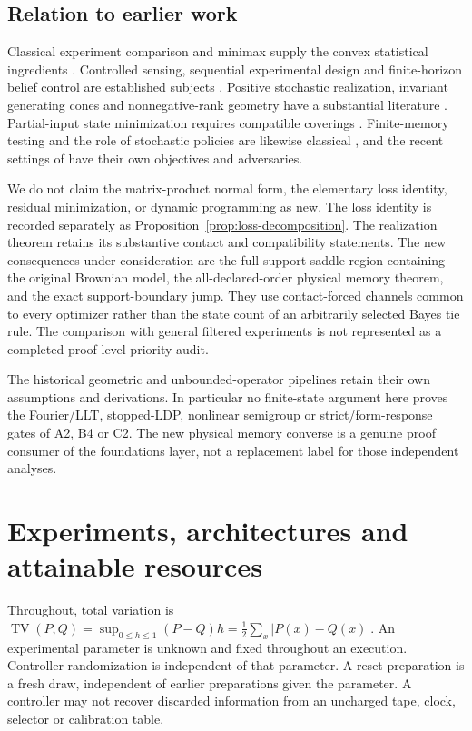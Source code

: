 \documentclass[11pt]{amsart}
\theoremstyle{definition}\newtheorem{definition}[theorem]{Definition}
\theoremstyle{remark}\newtheorem{remark}[theorem]{Remark}
\newcommand{\TV}{\operatorname{TV}}
\newcommand{\1}{\mathbf 1}
\begin{document}
\subsection{Relation to earlier work}
Classical experiment comparison and minimax supply the convex
statistical ingredients \cite{Blackwell,Sion}. Controlled sensing,
sequential experimental design and finite-horizon belief control are
established subjects \cite{Chernoff,SmallwoodSondik,NJ,NAV}.
Positive stochastic realization, invariant generating cones and
nonnegative-rank geometry have a substantial literature
\cite{Heller,Vidyasagar,GG}. Partial-input state minimization requires
compatible coverings \cite{Reusch}. Finite-memory testing and the
role of stochastic policies are likewise classical
\cite{HC,HCrandom,FH,CFH}, and the recent settings of
\cite{MP,ZSV} have their own objectives and adversaries.

We do not claim the matrix-product normal form, the elementary loss
identity, residual minimization, or dynamic programming as new.
The loss identity is recorded separately as
Proposition~\ref{prop:loss-decomposition}. The realization theorem
retains its substantive contact and compatibility statements.
The new consequences under consideration are the full-support saddle
region containing the original Brownian model, the all-declared-order
physical memory theorem, and the exact support-boundary jump.
They use contact-forced channels common to every optimizer rather than
the state count of an arbitrarily selected Bayes tie rule.
The comparison with general filtered experiments \cite{Norberg} is
not represented as a completed proof-level priority audit.

The historical geometric and unbounded-operator pipelines retain their
own assumptions and derivations. In particular no finite-state argument
here proves the Fourier/LLT, stopped-LDP, nonlinear semigroup or
strict/form-response gates of A2, B4 or C2. The new physical memory
converse is a genuine proof consumer of the foundations layer, not a
replacement label for those independent analyses.


\section{Experiments, architectures and attainable resources}
\label{sec:model}
Throughout, total variation is
$\TV(P,Q)=\sup_{0\le h\le1}(P-Q)h=\frac12\sum_x|P(x)-Q(x)|$.
An experimental parameter is unknown and fixed throughout an execution.
Controller randomization is independent of that parameter. A reset
preparation is a fresh draw, independent of earlier preparations given
the parameter. A controller may not recover discarded information from
an uncharged tape, clock, selector or calibration table.
\end{document}
